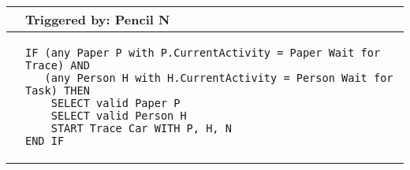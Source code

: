 \begin{longtable}{@{}>{\raggedright\arraybackslash}p{0.25cm}>{\raggedright\arraybackslash}p{13cm}@{}}
  \toprule
   & Triggered by: Pencil N\\ \midrule 
  &
\begin{lstlisting}[language=CMPseudo]
IF (any Paper P with P.CurrentActivity = Paper Wait for Trace) AND
   (any Person H with H.CurrentActivity = Person Wait for Task) THEN
    SELECT valid Paper P
    SELECT valid Person H
    START Trace Car WITH P, H, N
END IF
\end{lstlisting}
  \\ \bottomrule
  \end{longtable}